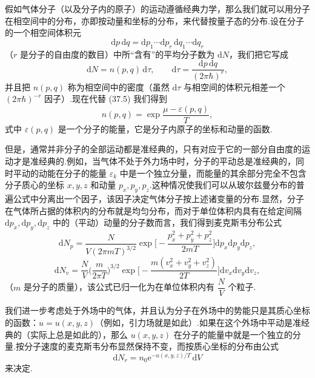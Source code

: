 假如气体分子（以及分子内的原子）的运动遵循经典力学，那么我们就可以用分子在相空间中的分布，亦即按动量和坐标的分布，来代替按量子态的分布.设在分子的一个相空间体积元
\begin{equation*}
  \mathrm{d}p\,\mathrm{d}q=\mathrm{d}p_1\cdots\mathrm{d}p_r\,\mathrm{d}q_1\cdots\mathrm{d}q_r
\end{equation*}
（$r$ 是分子的自由度的数目）中所“含有”的平均分子数为 $\mathrm{d}N$，我们把它写成
\begin{equation}
  \mathrm{d}N=n(p,q)\,\mathrm{d}\tau,\qquad
  \mathrm{d}\tau=\frac{\mathrm{d}p\,\mathrm{d}q}{(2\pi\hbar)^{r}},
\end{equation}
并且把 $n(p,q)$ 称为相空间中的密度（虽然 $\mathrm{d}\tau$ 与相空间的体积元相差一个 $(2\pi\hbar)^{-r}$ 因子）.现在代替 (37.5) 我们得到
\begin{equation}
  n(p,q)=\exp\frac{\mu-\varepsilon(p,q)}{T},
\end{equation}
式中 $\varepsilon(p,q)$ 是一个分子的能量，它是分子内原子的坐标和动量的函数.

但是，通常并非分子的全部运动都是准经典的，只有对应于它的一部分自由度的运动才是准经典的.例如，当气体不处于外力场中时，分子的平动总是准经典的，同时平动的动能在分子的能量 $\varepsilon_k$ 中是一个独立分量，而能量的其余部分完全不包含分子质心的坐标 $x,y,z$ 和动量 $p_x,p_y,p_z$.这种情况使我们可以从玻尔兹曼分布的普遍公式中分离出一个因子，该因子决定气体分子按上述诸变量的分布.显然，分子在气体所占据的体积内的分布就是均匀分布，而对于单位体积内具有在给定间隔 $\mathrm{d}p_x,\mathrm{d}p_y,\mathrm{d}p_z$ 中的（平动）动量的分子数而言，我们得到麦克斯韦分布公式
\begin{equation}
  \mathrm{d}N_p=\frac{N}{V(2\pi mT)^{3/2}}
  \exp\Bigg[-\frac{p_x^2+p_y^2+p_z^2}{2mT}\Bigg]
  \mathrm{d}p_x\mathrm{d}p_y\mathrm{d}p_z,
\end{equation}
\begin{equation}
  \mathrm{d}N_v=\frac{N}{V}\Big(\frac{m}{2\pi T}\Big)^{3/2}
  \exp\Bigg[-\frac{m(v_x^2+v_y^2+v_z^2)}{2T}\Bigg]
  \mathrm{d}v_x\mathrm{d}v_y\mathrm{d}v_z,
\end{equation}
（$m$ 是分子的质量），该公式已归一化为在单位体积内有 $\dfrac{N}{V}$ 个粒子.

我们进一步考虑处于外场中的气体，并且认为分子在外场中的势能只是其质心坐标的函数：$u=u(x,y,z)$（例如，引力场就是如此）.如果在这个外场中平动是准经典的（实际上总是如此的），那么 $u(x,y,z)$ 在分子的能量中就是一个独立的分量.按分子速度的麦克斯韦分布显然保持不变，而按质心坐标的分布由公式
\begin{equation}
  \mathrm{d}N_r=n_0\mathrm{e}^{-u(x,y,z)/T}\,\mathrm{d}V
\end{equation}
来决定.

